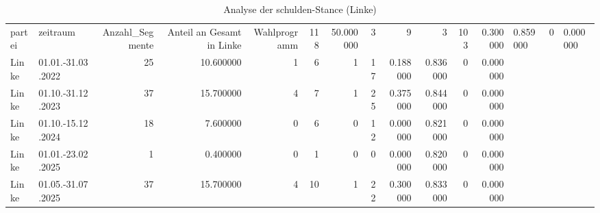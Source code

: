 \begin{table}
\caption{Analyse der schulden-Stance (Linke)}
\label{tab:meine_tabelle}
\begin{tabular}{llrrrrrrrrrr}
\toprule
partei & zeitraum & Anzahl_Segmente & Anteil an Gesamt in %
\midrule
Linke & Wahlprogramm & 118 & 50.000000 & 3 & 9 & 3 & 103 & 0.300000 & 0.859000 & 0 & 0.000000 \\
Linke & 01.01.-31.03.2022 & 25 & 10.600000 & 1 & 6 & 1 & 17 & 0.188000 & 0.836000 & 0 & 0.000000 \\
Linke & 01.10.-31.12.2023 & 37 & 15.700000 & 4 & 7 & 1 & 25 & 0.375000 & 0.844000 & 0 & 0.000000 \\
Linke & 01.10.-15.12.2024 & 18 & 7.600000 & 0 & 6 & 0 & 12 & 0.000000 & 0.821000 & 0 & 0.000000 \\
Linke & 01.01.-23.02.2025 & 1 & 0.400000 & 0 & 1 & 0 & 0 & 0.000000 & 0.820000 & 0 & 0.000000 \\
Linke & 01.05.-31.07.2025 & 37 & 15.700000 & 4 & 10 & 1 & 22 & 0.300000 & 0.833000 & 0 & 0.000000 \\
\bottomrule
\end{tabular}
\end{table}
